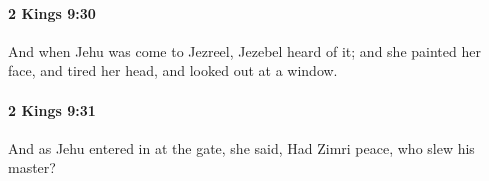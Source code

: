 		\paragraph{2 Kings 9:30} %
			\label{2KINGS-9-30}

			And when Jehu was come to Jezreel, Jezebel heard of it; and she painted her face, and tired her head, and looked out at a window.


		\paragraph{2 Kings 9:31} %
			\label{2KINGS-9-31}

			And as Jehu entered in at the gate, she said, Had Zimri peace, who slew his master?



